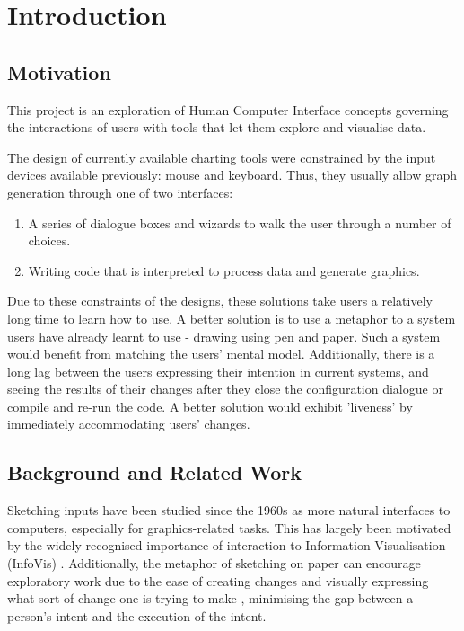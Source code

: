 \chapter{Introduction}
\section{Motivation}
This project is an exploration of Human Computer Interface concepts governing the interactions of users with tools that let them explore and visualise data.

The design of currently available charting tools were constrained by the input devices available previously: mouse and keyboard. Thus, they usually allow graph generation through one of two interfaces:
\begin{enumerate}
\item A series of dialogue boxes and wizards to walk the user through a number of choices.
\item Writing code that is interpreted to process data and generate graphics.
\end{enumerate}

Due to these constraints of the designs, these solutions take users a relatively long time to learn how to use. A better solution is to use a metaphor to a system users have already learnt to use - drawing using pen and paper. Such a system would benefit from matching the users' mental model. Additionally, there is a long lag between the users expressing their intention in current systems, and seeing the results of their changes after they close the configuration dialogue or compile and re-run the code. A better solution would exhibit 'liveness' by immediately accommodating users' changes.

\section{Background and Related Work}
Sketching inputs have been studied since the 1960s \citep{sutherland_sketch_1964} as more natural interfaces to computers, especially for graphics-related tasks. This has largely been motivated by the widely recognised importance of interaction to Information Visualisation (InfoVis) \citep{lee_beyond_2012}. Additionally, the metaphor of sketching on paper can encourage exploratory work due to the ease of creating changes and visually expressing what sort of change one is trying to make \citep{Citation Needed}, minimising the gap between a person's intent and the execution of the intent.

